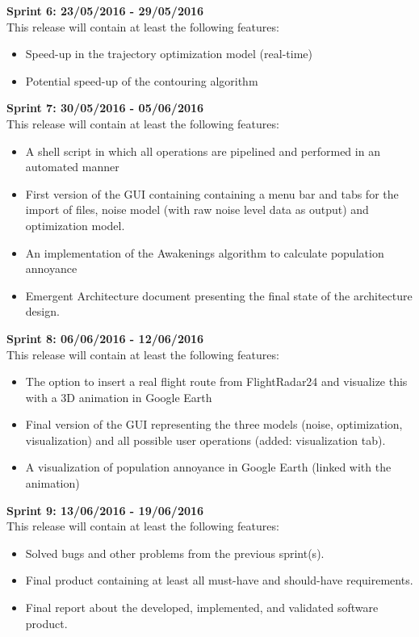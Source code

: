 \textbf{Sprint 6: 23/05/2016 - 29/05/2016} \\
This release will contain at least the following features:
\begin{itemize}
\item Speed-up in the trajectory optimization model (real-time)
\item Potential speed-up of the contouring algorithm
\end{itemize}

\textbf{Sprint 7: 30/05/2016 - 05/06/2016} \\
This release will contain at least the following features:
\begin{itemize}
\item A shell script in which all operations are pipelined and performed in an automated manner
\item First version of the GUI containing containing a menu bar and tabs for the import of files, noise model (with raw noise level data as output) and optimization model.
\item An implementation of the Awakenings algorithm to calculate population annoyance
\item Emergent Architecture document presenting the final state of the architecture design. 
\end{itemize}

\textbf{Sprint 8: 06/06/2016 - 12/06/2016} \\
This release will contain at least the following features:
\begin{itemize}
\item The option to insert a real flight route from FlightRadar24 and visualize this with a 3D animation in Google Earth
\item Final version of the GUI representing the three models (noise, optimization, visualization) and all possible user operations (added: visualization tab).
\item A visualization of population annoyance in Google Earth (linked with the animation)
\end{itemize}

\textbf{Sprint 9: 13/06/2016 - 19/06/2016} \\
This release will contain at least the following features:
\begin{itemize}
\item Solved bugs and other problems from the previous sprint(s).
\item Final product containing at least all must-have and should-have requirements.
\item Final report about the developed, implemented, and validated software product.
\end{itemize}